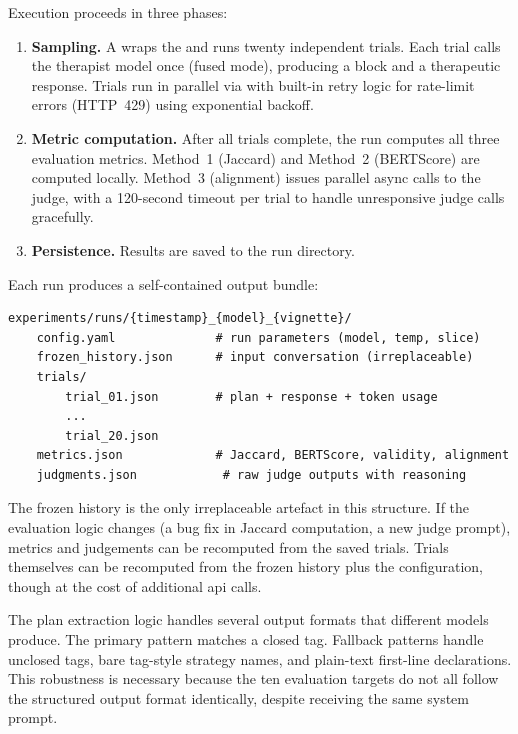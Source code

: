 Execution proceeds in three phases:

\begin{enumerate}
  \item \textbf{Sampling.} A  wraps the
     and runs twenty independent trials. Each trial
    calls the therapist model once (fused mode), producing a
     block and a therapeutic response. Trials run in
    parallel via  with built-in retry logic for
    rate-limit errors (HTTP~429) using exponential backoff.
  \item \textbf{Metric computation.} After all trials complete, the run
    computes all three evaluation metrics. Method~1 (Jaccard) and Method~2
    (BERTScore) are computed locally. Method~3 (alignment) issues parallel
    async calls to the  judge, with a 120-second timeout
    per trial to handle unresponsive judge calls gracefully.
  \item \textbf{Persistence.} Results are saved to the run directory.
\end{enumerate}

Each run produces a self-contained output bundle:

\begin{verbatim}
experiments/runs/{timestamp}_{model}_{vignette}/
    config.yaml              # run parameters (model, temp, slice)
    frozen_history.json      # input conversation (irreplaceable)
    trials/
        trial_01.json        # plan + response + token usage
        ...
        trial_20.json
    metrics.json             # Jaccard, BERTScore, validity, alignment
    judgments.json            # raw judge outputs with reasoning
\end{verbatim}

The frozen history is the only irreplaceable artefact in this structure.
If the evaluation logic changes (a bug fix in Jaccard computation, a new
judge prompt), metrics and judgements can be recomputed from the saved
trials. Trials themselves can be recomputed from the frozen history plus
the configuration, though at the cost of additional \gls{api} calls.

The plan extraction logic handles several output formats that different
models produce. The primary pattern matches a closed 
tag. Fallback patterns handle unclosed tags, bare tag-style strategy
names, and plain-text first-line declarations. This robustness is
necessary because the ten evaluation targets do not all follow the
structured output format identically, despite receiving the same system
prompt.

